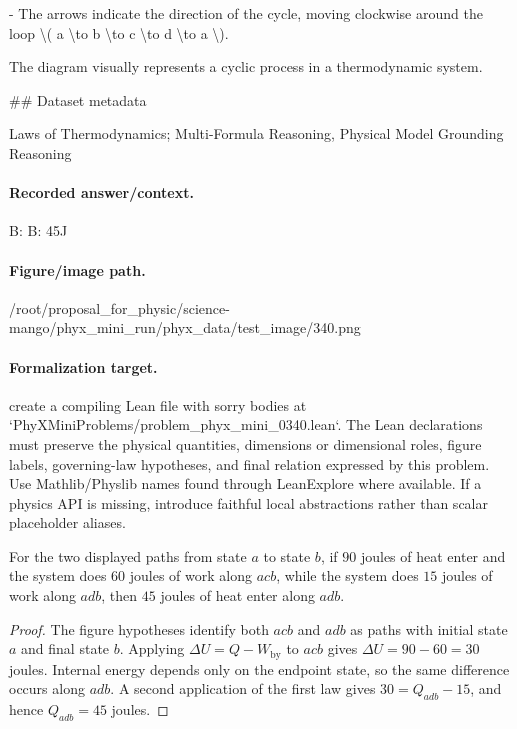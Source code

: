- The arrows indicate the direction of the cycle, moving clockwise around the loop \textbackslash{}( a \textbackslash{}to b \textbackslash{}to c \textbackslash{}to d \textbackslash{}to a \textbackslash{}).

The diagram visually represents a cyclic process in a thermodynamic system.

\#\# Dataset metadata

Laws of Thermodynamics; Multi-Formula Reasoning, Physical Model Grounding Reasoning

\paragraph{Recorded answer/context.}
B: B: 45J

\paragraph{Figure/image path.}
/root/proposal\_for\_physic/science-mango/phyx\_mini\_run/phyx\_data/test\_image/340.png

\paragraph{Formalization target.}
create a compiling Lean file with sorry bodies at `PhyXMiniProblems/problem\_phyx\_mini\_0340.lean`. The Lean declarations must preserve the physical quantities, dimensions or dimensional roles, figure labels, governing-law hypotheses, and final relation expressed by this problem.
Use Mathlib/Physlib names found through LeanExplore where available. If a physics API is missing, introduce faithful local abstractions rather than scalar placeholder aliases.

\begin{theorem}
\label{thm:physics:phyx_mini_0340:target}
For the two displayed paths from state \(a\) to state \(b\), if \(90\) joules
of heat enter and the system does \(60\) joules of work along \(acb\), while
the system does \(15\) joules of work along \(adb\), then \(45\) joules of
heat enter along \(adb\).
\end{theorem}
\begin{proof}
The figure hypotheses identify both \(acb\) and \(adb\) as paths with initial
state \(a\) and final state \(b\).  Applying
\(\Delta U=Q-W_{\mathrm{by}}\) to \(acb\) gives
\(\Delta U=90-60=30\) joules.  Internal energy depends only on the endpoint
state, so the same difference occurs along \(adb\).  A second application of
the first law gives \(30=Q_{adb}-15\), and hence \(Q_{adb}=45\) joules.
\end{proof}

